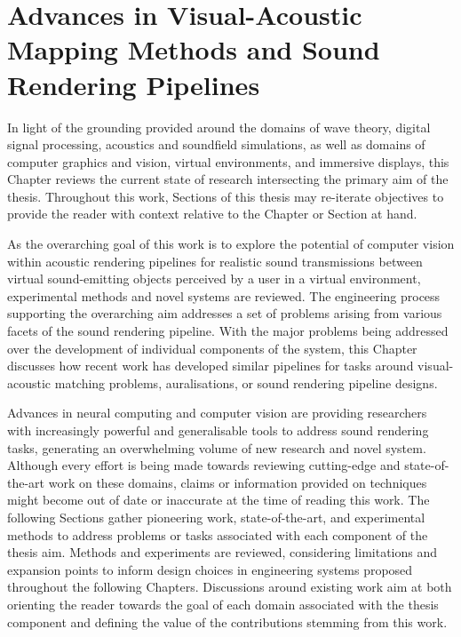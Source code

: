 \chapter{Advances in Visual-Acoustic Mapping Methods and Sound Rendering Pipelines}\label{ch:lit-review}%
In light of the grounding provided around the domains of wave theory, digital signal processing, acoustics and soundfield simulations, as well as domains of computer graphics and vision, virtual environments, and immersive displays, this Chapter reviews the current state of research intersecting the primary aim of the thesis. Throughout this work, Sections of this thesis may re-iterate objectives to provide the reader with context relative to the Chapter or Section at hand.\par
As the overarching goal of this work is to explore the potential of computer vision within acoustic rendering pipelines for realistic sound transmissions between virtual sound-emitting objects perceived by a user in a virtual environment, experimental methods and novel systems are reviewed. The engineering process supporting the overarching aim addresses a set of problems arising from various facets of the sound rendering pipeline. With the major problems being addressed over the development of individual components of the system, this Chapter discusses how recent work has developed similar pipelines for tasks around visual-acoustic matching problems, auralisations, or sound rendering pipeline designs.\par
Advances in neural computing and computer vision are providing researchers with increasingly powerful and generalisable tools to address sound rendering tasks, generating an overwhelming volume of new research and novel system. Although every effort is being made towards reviewing cutting-edge and state-of-the-art work on these domains, claims or information provided on techniques might become out of date or inaccurate at the time of reading this work. The following Sections gather pioneering work, state-of-the-art, and experimental methods to address problems or tasks associated with each component of the thesis aim. Methods and experiments are reviewed, considering limitations and expansion points to inform design choices in engineering systems proposed throughout the following Chapters. Discussions around existing work aim at both orienting the reader towards the goal of each domain associated with the thesis component and defining the value of the contributions stemming from this work.\par


